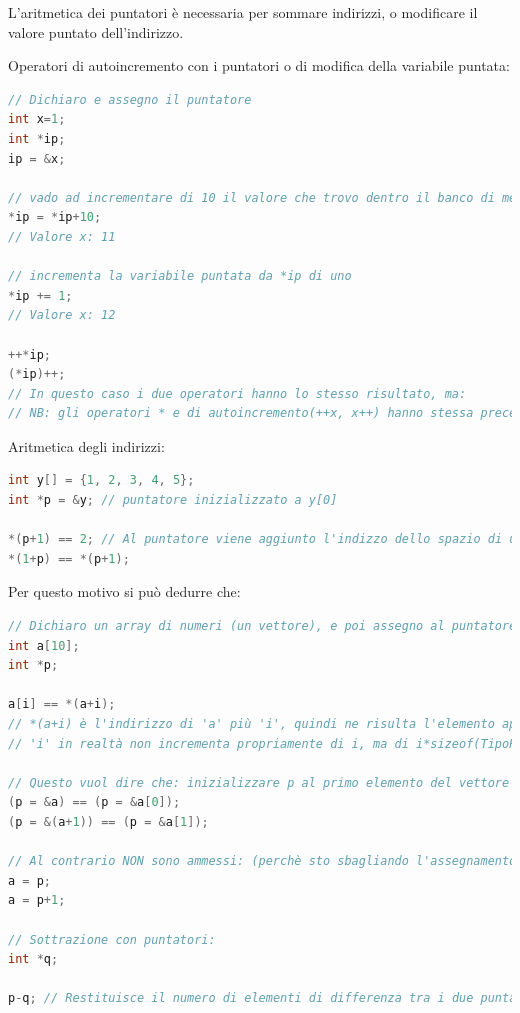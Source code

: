 \documentclass[
  paper=a4,
  oneside  ,captions=tableheading
]{scrbook}
\begin{document}
L'aritmetica dei puntatori è necessaria per sommare indirizzi, o
modificare il valore puntato dell'indirizzo.

Operatori di autoincremento con i puntatori o di modifica della
variabile puntata:

\begin{lstlisting}[language=C]
// Dichiaro e assegno il puntatore
int x=1;
int *ip;
ip = &x;

// vado ad incrementare di 10 il valore che trovo dentro il banco di memoria
*ip = *ip+10;
// Valore x: 11

// incrementa la variabile puntata da *ip di uno
*ip += 1; 
// Valore x: 12

++*ip; 
(*ip)++;
// In questo caso i due operatori hanno lo stesso risultato, ma:
// NB: gli operatori * e di autoincremento(++x, x++) hanno stessa precedenza, di conseguenza il compilatore avrebbe associato da destra e il risultato potrebbe risultare diverso.
\end{lstlisting}

Aritmetica degli indirizzi:

\begin{lstlisting}[language=C]
int y[] = {1, 2, 3, 4, 5};
int *p = &y; // puntatore inizializzato a y[0]

*(p+1) == 2; // Al puntatore viene aggiunto l'indizzo dello spazio di un intero, siccome il puntatore è inizializzato ad intero. Questo significa praticamente che si prende il valore intero +1 rispetto al puntatore.
*(1+p) == *(p+1); 
\end{lstlisting}

Per questo motivo si può dedurre che:

\begin{lstlisting}[language=C]
// Dichiaro un array di numeri (un vettore), e poi assegno al puntatore a intero l'indirizzo del primo elemento del vettore. 
int a[10];
int *p;

a[i] == *(a+i); 
// *(a+i) è l'indirizzo di 'a' più 'i', quindi ne risulta l'elemento appartenente all'insieme 'a' in posizione 'i'
// 'i' in realtà non incrementa propriamente di i, ma di i*sizeof(TipoPuntatore)

// Questo vuol dire che: inizializzare p al primo elemento del vettore in questi due modi è equivalente
(p = &a) == (p = &a[0]);
(p = &(a+1)) == (p = &a[1]);

// Al contrario NON sono ammessi: (perchè sto sbagliando l'assegnamento a destra)
a = p;
a = p+1;

// Sottrazione con puntatori:
int *q;

p-q; // Restituisce il numero di elementi di differenza tra i due puntatori, ovvero il numero di spazi di memoria tra i due. ATTENZIONE: NON RESTITUISCE LA DIFFERENZA FRA I VALORI DEI DUE PUNTATORI
\end{lstlisting}
\end{document}
